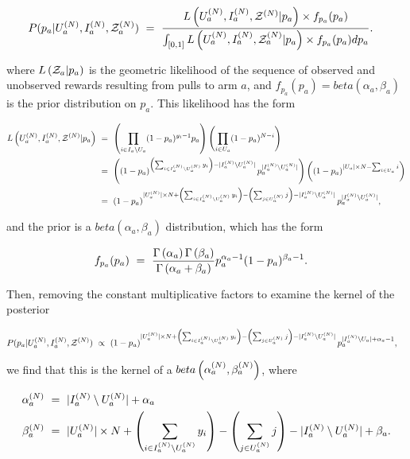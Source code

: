 \documentclass{article}
\begin{document}
\begin{align*}
    P( p_a | U_a^{(N)}, I_a^{(N)}, \mathcal{Z}_a^{(N)} )\ &=\ \frac{L \left(  U_a^{(N)}, I_a^{(N)}, \mathcal{Z}^{(N)} | p_a \right) \times f_{p_a}(p_a)}{\int_{[0,1]} L \left(  U_a^{(N)}, I_a^{(N)}, \mathcal{Z}_a^{(N)} | p_a \right) \times f_{p_a}(p_a) dp_a} \textnormal{.}
\end{align*}

\noindent where $L \left( \mathcal{Z}_a | p_a \right)$ is the geometric likelihood of the sequence of observed and unobserved rewards resulting from pulls to arm $a$, and $f_{p_a}(p_a) = beta(\alpha_a, \beta_a)$ is the prior distribution on $p_a$. This likelihood has the form

\begin{align*}
	L \fitp{ U_a^{(N)}, I_a^{(N)}, \mcZ^{(N)} | p_a }\ &=\ \fitp{\prod_{i \in I_a \setminus U_a} (1 - p_a)^{y_i - 1} p_a} \fitp{\prod_{i \in U_a} (1-p_a)^{N-i}}\\
	&=\ \fitp{\fitp{1 - p_a}^{\fitp{\sum_{i \in I_a^{(N)} \setminus U_a^{(N)}}y_i} - |I_a^{(N)} \setminus U_a^{(N)}|} p_a^{|I_a^{(N)} \setminus U_a^{(N)}|}} \fitp{\fitp{1 - p_a}^{|U_a| \times N - \sum_{i \in U_a} i}}\\
	&=\ \fitp{1 - p_a}^{|U_a^{(N)}| \times N + \fitp{\sum_{i \in I_a^{(N)} \setminus U_a^{(N)}} y_i} - \fitp{\sum_{j \in U_a^{(N)}} j} - |I_a^{(N)} \setminus U_a^{(N)}|} p_a^{|I_a^{(N)} \setminus U_a^{(N)}|} \tn{,}
\end{align*}

\noindent and the prior is a $beta(\alpha_a, \beta_a)$ distribution, which has the form

\begin{align*}
	f_{p_a}(p_a)\ &=\ \frac{\Gamma \left( \alpha_a \right) \Gamma \left( \beta_a \right)}{\Gamma \left( \alpha_a + \beta_a \right)} p_a^{\alpha_a - 1}(1 - p_a)^{\beta_a - 1} \textnormal{.}
\end{align*}

\noindent Then, removing the constant multiplicative factors to examine the kernel of the posterior

\begin{align*}
	P( p_a | U_a^{(N)}, I_a^{(N)}, \mathcal{Z}^{(N)} )\ &\propto\ \left( 1 - p_a \right)^{|U_a^{(N)}| \times N + \left( \sum_{i \in I_a^{(N)} \setminus U_a^{(N)}} y_i \right) - \left( \sum_{j \in U_a^{(N)}} j \right) - |I_a^{(N)} \setminus U_a^{(N)}|} p_a^{|I_a^{(N)} \setminus U_a| + \alpha_a - 1} \textnormal{,}
\end{align*}

\noindent we find that this is the kernel of a $beta \left( \alpha_a^{(N)}, \beta_a^{(N)} \right)$, where

\begin{align*}
	\alpha_a^{(N)}\ &=\ |I_a^{(N)} \setminus U_a^{(N)}| + \alpha_a\\
	\beta_a^{(N)}\ &=\ |U_a^{(N)}| \times N + \left( \sum_{i \in I_a^{(N)} \setminus U_a^{(N)}} y_i \right) - \left( \sum_{j \in U_a^{(N)}} j \right) - |I_a^{(N)} \setminus U_a^{(N)}| + \beta_a \textnormal{.}
\end{align*}
\end{document}
